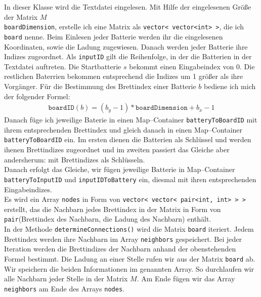 \documentclass[a4paper,10pt,ngerman]{scrartcl}
\begin{document}
In dieser Klasse wird die Textdatei eingelesen. Mit Hilfe der eingelesenen Größe der Matrix $M$\\ \texttt{boardDimension},
erstelle ich eine Matrix als \texttt{vector< vector<int> >}, die ich \texttt{board} nenne.
Beim Einlesen jeder Batterie werden ihr die eingelesenen Koordinaten, sowie die Ladung zugewiesen.
Danach werden jeder Batterie ihre Indizes zugeordnet. Als \texttt{inputID} gilt die
Reihenfolge, in der die Batterien in der Textdatei auftreten. Die Startbatterie $s$ bekommt einen
Eingabeindex von 0. Die restlichen Baterrien bekommen entsprechend die Indizes um 1 größer als ihre Vorgänger.
Für die Bestimmung des Brettindex einer Batterie $b$ bediene ich mich der folgender Formel:
\begin{align*}
\texttt{boardID}(b) = (b_y-1) * \texttt{boardDimension} + b_x-1
\end{align*}
Danach füge ich jeweilige Baterie in einen Map--Container \texttt{batteryToBoardID} mit ihrem entsprechenden Brettindex
und gleich danach in einen Map--Container \texttt{batteryToBoardID} ein. Im ersten dienen die Batterien als Schlüssel und werden
ihenen Brettindizes zugeordnet und im zweiten passiert das Gleiche aber andersherum: mit Brettindizes als Schlüsseln.\\
Danach erfolgt das Gleiche, wir fügen jeweilige Batterie in Map--Container \texttt{batteryToInputID} und
\texttt{inputIDToBattery} ein, diesmal mit ihren entsprechenden Eingabeindizes.\\

Es wird ein Array \texttt{nodes} in Form von \texttt{vector< vector< pair<int, int> > >}
erstellt, das die Nachbarn jedes Brettindex in der Matrix in Form von 
\texttt{pair}(Brettindex des Nachbarn, die Ladung des Nachbarn) enthält.\\
In der Methode \texttt{determineConnections()} wird die Matrix \texttt{board} iteriert.
Jedem Brettindex werden ihre Nachbarn im Array \texttt{neighbors} gespeichert.
Bei jeder Iteration werden die Brettindizes der Nachbarn anhand der obenstehenden Formel bestimmt.
Die Ladung an einer Stelle rufen wir aus der Matrix \texttt{board} ab. Wir speichern die beiden Informationen
im genannten Array. So durchlaufen wir alle Nachbarn jeder Stelle in der Matrix $M$.
Am Ende fügen wir das Array \texttt{neighbors} am Ende des Arrays \texttt{nodes}.\\
\end{document}
